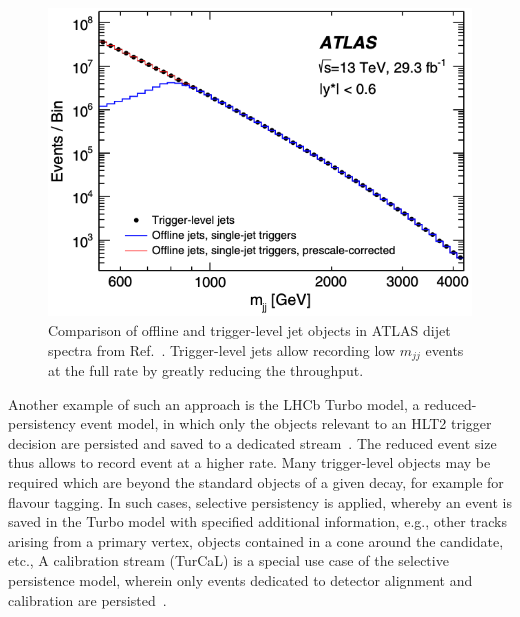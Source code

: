 \begin{figure}[h!]
    \centering
    \includegraphics[width=0.55\linewidth]{images/atlas/ATLAS-TLA.png}
    \caption{Comparison of offline and trigger-level jet objects in ATLAS dijet spectra from Ref.~\cite{ATLAS:2018qto}. Trigger-level jets allow recording low $m_{jj}$ events at the full rate by greatly reducing the throughput.}
    \label{fig:trigger-level-efficiencies}
\end{figure}

Another example of such an approach is the LHCb Turbo model, a reduced-persistency event model, in which only the objects relevant to an HLT2 trigger decision are persisted and saved to a dedicated stream~\cite{Aaij:2016rxn}. The reduced event size thus allows to record event at a higher rate. Many trigger-level objects may be required which are beyond the standard objects of a given decay, for example for flavour tagging. In such cases, selective persistency is applied, whereby an event is saved in the Turbo model with specified additional information, e.g., other tracks arising from a primary vertex, objects contained in a cone around the candidate, etc., A calibration stream (TurCaL) is a special use case of the selective persistence model, wherein only events dedicated to detector alignment and calibration are persisted~\cite{Aaij:2019uij}.





